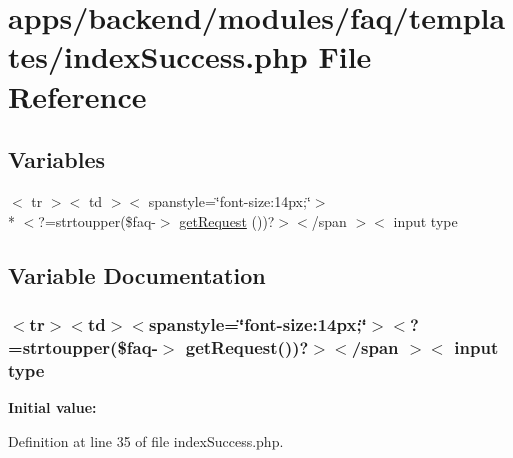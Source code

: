 \hypertarget{backend_2modules_2faq_2templates_2index_success_8php}{\section{apps/backend/modules/faq/templates/index\-Success.php File Reference}
\label{backend_2modules_2faq_2templates_2index_success_8php}
}
\subsection*{Variables}
\begin{DoxyCompactItemize}
\item 
$<$ tr $>$$<$ td $>$$<$ spanstyle=\char`\"{}font-\/size\-:14px;\char`\"{}$>$\\*
$<$?=strtoupper(\$faq-\/$>$ \hyperlink{backend_2modules_2faq_2templates_2index_success_8php_abf9262d23caf158d4dcb0a3d79f33959}{get\-Request} ())?$>$$<$/span $>$$<$ input type
\end{DoxyCompactItemize}


\subsection{Variable Documentation}
\hypertarget{backend_2modules_2faq_2templates_2index_success_8php_abf9262d23caf158d4dcb0a3d79f33959}{
\subsubsection[{get\-Request}]{\setlength{\rightskip}{0pt plus 5cm}$<$tr$>$$<$td$>$$<$spanstyle=\char`\"{}font-\/size\-:14px;\char`\"{}$>$$<$?=strtoupper(\$faq-\/$>$ get\-Request())?$>$$<$/span $>$$<$ input type}}\label{backend_2modules_2faq_2templates_2index_success_8php_abf9262d23caf158d4dcb0a3d79f33959}
{\bfseries Initial value\-:}


Definition at line 35 of file index\-Success.\-php.

